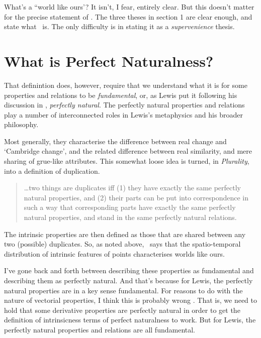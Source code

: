 \noindent What's a ``world like ours'? It isn't, I fear, entirely clear. But this doesn't matter for the precise statement of \HS. The three theses in section 1 are clear enough, and state what \HS\ is. The only difficulty is in stating it as a \textit{supervenience} thesis.

\section{What is Perfect Naturalness?}
That definintion does, however, require that we understand what it is for some properties and relations to be \textit{fundamental}, or, as Lewis put it following his discussion in \citet{Lewis1983e}, \textit{perfectly natural}. The perfectly natural properties and relations play a number of interconnected roles in Lewis's metaphysics and his broader philosophy.

Most generally, they characterise the difference between real change and `Cambridge change', and the related difference between real similarity, and mere sharing of grue-like attributes. This somewhat loose idea is turned, in \textit{Plurality}, into a definition of duplication.

\begin{quote}
\dots two things are duplicates iff (1) they have exactly the same perfectly natural properties, and (2) their parts can be put into correspondence in such a way that corresponding parts have exactly the same perfectly natural properties, and stand in the same perfectly natural relations. \citep[61]{Lewis1986a}
\end{quote}

\noindent The intrinsic properties are then defined as those that are shared between any two (possible) duplicates. So, as noted above, \HS\ says that the spatio-temporal distribution of intrinsic features of points characterises worlds like ours.

I've gone back and forth between describing these properties as fundamental and describing them as perfectly natural. And that's because for Lewis, the perfectly natural properties are in a key sense fundamental. For reasons to do with the nature of vectorial properties, I think this is probably wrong \citep{Weatherson2006-WEATAM}. That is, we need to  hold that some derivative properties are perfectly natural in order to get the definition of intrinsicness terms of perfect naturalness to work. But for Lewis, the perfectly natural properties and relations are all fundamental.

